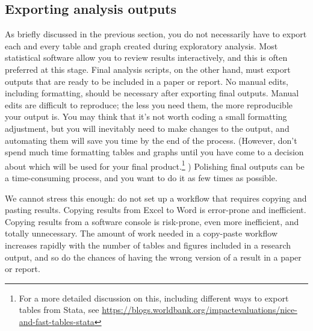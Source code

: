 \documentclass[
]{book}
\begin{document}
\hypertarget{exporting-analysis-outputs}{%
\subsection*{Exporting analysis outputs}\label{exporting-analysis-outputs}}

As briefly discussed in the previous section,
you do not necessarily have to export each and every table and graph
created during exploratory analysis.
Most statistical software allow you to review results interactively,
and this is often preferred at this stage.
Final analysis scripts, on the other hand, must export outputs
that are ready to be included in a paper or report.
No manual edits, including formatting,
should be necessary after exporting final outputs.
Manual edits are difficult to reproduce;
the less you need them, the more reproducible your output is.
You may think that it's not worth coding a small formatting adjustment,
but you will inevitably need to make changes to the output,
and automating them will save you time by the end of the process.
(However, don't spend much time formatting tables and graphs until
you have come to a decision about which will be used for your final product.\footnote{For a more detailed discussion on this, including different ways to export tables from Stata,
  see \url{https://blogs.worldbank.org/impactevaluations/nice-and-fast-tables-stata}}
)
Polishing final outputs can be a time-consuming process,
and you want to do it as few times as possible.

We cannot stress this enough:
do not set up a workflow that requires copying and pasting results.
Copying results from Excel to Word is error-prone and inefficient.
Copying results from a software console is risk-prone,
even more inefficient, and totally unnecessary.
The amount of work needed in a copy-paste workflow increases
rapidly with the number of tables and figures included in a research output,
and so do the chances of having the wrong version of a result in a paper or report.
\end{document}
